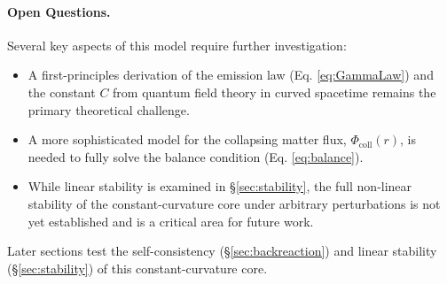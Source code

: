 \paragraph{Open Questions.}
Several key aspects of this model require further investigation:
\begin{itemize}
    \item A first-principles derivation of the emission law (Eq. \ref{eq:GammaLaw}) and the constant $C$ from quantum field theory in curved spacetime remains the primary theoretical challenge.
    \item A more sophisticated model for the collapsing matter flux, $\Phi_{\mathrm{coll}}(r)$, is needed to fully solve the balance condition (Eq. \ref{eq:balance}).
    \item While linear stability is examined in \S\ref{sec:stability}, the full non-linear stability of the constant-curvature core under arbitrary perturbations is not yet established and is a critical area for future work.
\end{itemize}
Later sections test the self-consistency (§\ref{sec:backreaction}) and linear stability (§\ref{sec:stability}) of this constant-curvature core.

